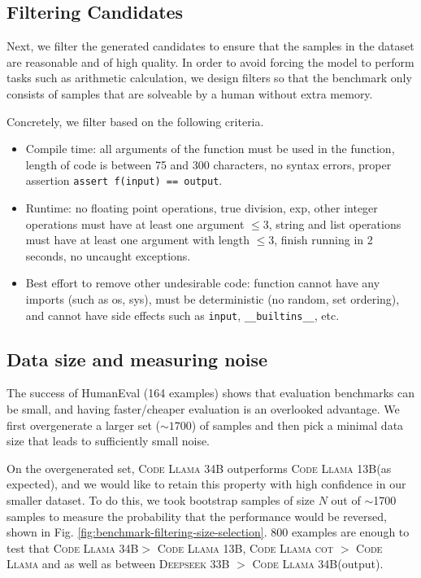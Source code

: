 \documentclass{article}
\newcommand{\codellamamed}{\textsc{Code Llama 13B}\xspace}
\newcommand{\codellamalarge}{\textsc{Code Llama 34B}\xspace}
\theoremstyle{plain}
\theoremstyle{definition}
\theoremstyle{remark}
\begin{document}
\subsection{Filtering Candidates} \label{subsec:filtering-candidates}
Next, we filter the generated candidates to ensure that the samples in the dataset are reasonable and of high quality. In order to avoid forcing the model to perform tasks such as arithmetic calculation, we design filters so that the benchmark only consists of samples that are solveable by a human without extra memory.

Concretely, we filter based on the following criteria. 
\begin{itemize}
    \item Compile time: all arguments of the function must be used in the function, length of code is between 75 and 300 characters, no syntax errors, proper assertion \texttt{assert f(input) == output}.

    \item Runtime: no floating point operations, true division, exp, other integer operations must have at least one argument $\leq 3$, string and list operations must have at least one argument with length $\leq 3$, finish running in 2 seconds, no uncaught exceptions.

    \item Best effort to remove other undesirable code: function cannot have any imports (such as os, sys), must be deterministic (no random, set ordering), and cannot have side effects such as \texttt{input}, \texttt{\_\_builtins\_\_}, etc.
\end{itemize}

\subsection{Data size and measuring noise} \label{subsec:data-size-noise}
The success of HumanEval (164 examples) shows that evaluation benchmarks can be small, and having faster/cheaper evaluation is an overlooked advantage. We first overgenerate a larger set ($\sim1700$) of samples and then pick a minimal data size that leads to sufficiently small noise. 


On the overgenerated set, \codellamalarge outperforms \codellamamed (as expected), and we would like to retain this property with high confidence in our smaller dataset. To do this, we took bootstrap samples of size $N$ out of $\sim$1700 samples to measure the probability that the performance would be reversed, shown in Fig. \ref{fig:benchmark-filtering-size-selection}. 800 examples are enough to test that \codellamalarge $>$ \codellamamed, \textsc{Code Llama cot} $>$ \textsc{Code Llama} and  as well as between \textsc{Deepseek 33B} $>$ \codellamalarge (output).
\end{document}
